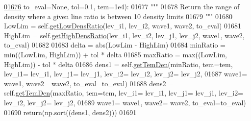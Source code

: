 \begin{DoxyCode}
\hypertarget{classpyneb_1_1core_1_1pynebcore_1_1_atom_l01676}{}\hyperlink{classpyneb_1_1core_1_1pynebcore_1_1_atom_a30ea60641df87c5eaf8af392d31da920}{01676}                         to\_eval=\textcolor{keywordtype}{None}, tol=0.1, tem=1e4):
01677         \textcolor{stringliteral}{"""}
01678 \textcolor{stringliteral}{        Return the range of density where a given line ratio is between 10%
       density limits}
01679 \textcolor{stringliteral}{        """}
01680         LowLim = self.\hyperlink{classpyneb_1_1core_1_1pynebcore_1_1_atom_aa6db2a3425e5a35f0bd04f05bcb25ee1}{getLowDensRatio}(lev\_i1, lev\_i2, wave1, wave2, to\_eval)
01681         HighLim = self.\hyperlink{classpyneb_1_1core_1_1pynebcore_1_1_atom_ac2e1509a2acc642c00696f3787e95f95}{getHighDensRatio}(lev\_i1, lev\_i2, lev\_j1, lev\_j2, wave1, wave2, 
      to\_eval)
01682         
01683         delta = abs(LowLim - HighLim)
01684         minRatio = min((LowLim, HighLim)) + tol * delta
01685         maxRatio = max((LowLim, HighLim)) - tol * delta
01686         dens1 = self.\hyperlink{classpyneb_1_1core_1_1pynebcore_1_1_atom_a5e1aa59c92bf62bae8bd756a4405eb25}{getTemDen}(minRatio, tem=tem, lev\_i1= lev\_i1, lev\_j1= lev\_j1, lev\_i2= lev\_i2, 
      lev\_j2= lev\_j2,
01687                   wave1= wave1, wave2= wave2, to\_eval=to\_eval)
01688         dens2 = self.\hyperlink{classpyneb_1_1core_1_1pynebcore_1_1_atom_a5e1aa59c92bf62bae8bd756a4405eb25}{getTemDen}(maxRatio, tem=tem, lev\_i1= lev\_i1, lev\_j1= lev\_j1, lev\_i2= lev\_i2, 
      lev\_j2= lev\_j2,
01689                   wave1= wave1, wave2= wave2, to\_eval=to\_eval)
01690         return(np.sort((dens1, dens2)))
01691                
\end{DoxyCode}
\hypertarget{classpyneb_1_1core_1_1pynebcore_1_1_atom_aaf4e84a9d5f835e6284bd9302314f775}{}
